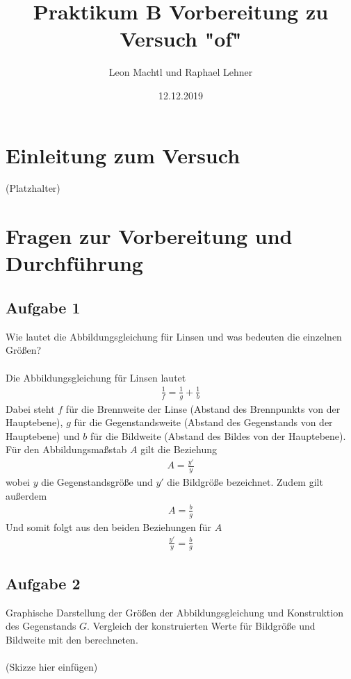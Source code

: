 \documentclass[a4paper,10pt]{scrartcl}
\title{Praktikum B Vorbereitung zu Versuch "of"}
\author{Leon Machtl und Raphael Lehner}
\date{12.12.2019}
\begin{document}
	\maketitle
	\tableofcontents
	\newpage
	
	\section{Einleitung zum Versuch}
	(Platzhalter)
	
	\section{Fragen zur Vorbereitung und Durchführung}
		
		\subsection{Aufgabe 1}
			Wie lautet die Abbildungsgleichung für Linsen und was bedeuten die einzelnen Größen?\\
			\\
			Die Abbildungsgleichung für Linsen lautet 
			\begin{align*}
			\frac{1}{f}=\frac{1}{g}+\frac{1}{b}
			\end{align*}
			Dabei steht \(f\) für die Brennweite der Linse (Abstand des Brennpunkts von der Hauptebene), \(g\) für die Gegenstandsweite (Abstand des Gegenstands von der Hauptebene) und \(b\) für die Bildweite (Abstand des Bildes von der Hauptebene).\\
			Für den Abbildungsmaßstab \(A\) gilt die Beziehung
			\begin{align*}
			A=\frac{y'}{y}
			\end{align*}
			wobei \(y\) die Gegenstandsgröße und \(y'\) die Bildgröße bezeichnet. Zudem gilt außerdem
			\begin{align*}
			A=\frac{b}{g}
			\end{align*}
			Und somit folgt aus den beiden Beziehungen für \(A\)
			\begin{align*}
			\frac{y'}{y}=\frac{b}{g}
			\end{align*}
			
		\subsection{Aufgabe 2}
			Graphische Darstellung der Größen der Abbildungsgleichung und Konstruktion des Gegenstands \(G\). Vergleich der konstruierten Werte für Bildgröße und Bildweite mit den berechneten.\\
			\\
			(Skizze hier einfügen)\\
			\\
			
\end{document}
